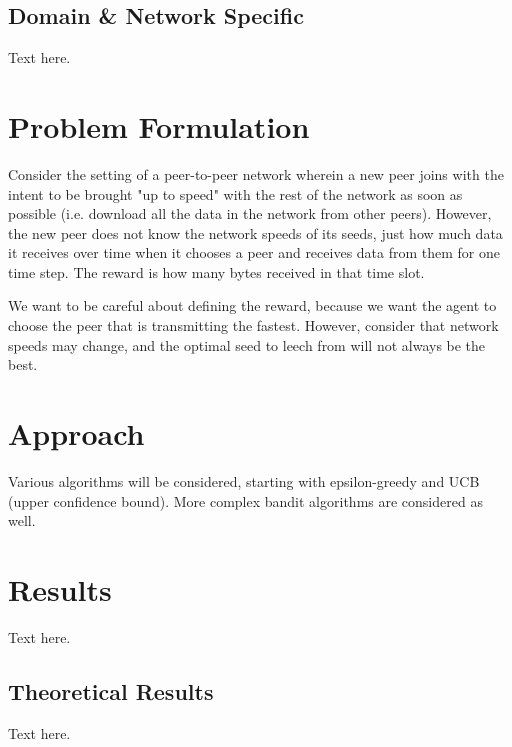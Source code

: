\documentclass{article}
\begin{document}
\subsection{Domain \& Network Specific}

Text here.


\section{Problem Formulation}

Consider the setting of a peer-to-peer network wherein a new peer joins with the intent to be brought "up to speed" with the rest of the network as soon as 
possible (i.e. download all the data in the network from other peers). However, the new peer does not know the network speeds of its seeds, just how much data 
it receives over time when it chooses a peer and receives data from them for one time step. The reward is how many bytes received in that time slot.

We want to be careful about defining the reward, because we want the agent to choose the peer that is transmitting the fastest. However, consider that network 
speeds may change, and the optimal seed to leech from will not always be the best.


\section{Approach}

Various algorithms will be considered, starting with epsilon-greedy and UCB (upper confidence bound). More complex bandit algorithms are considered as well.

\section{Results}
Text here.

\subsection{Theoretical Results} 
Text here.
\end{document}
